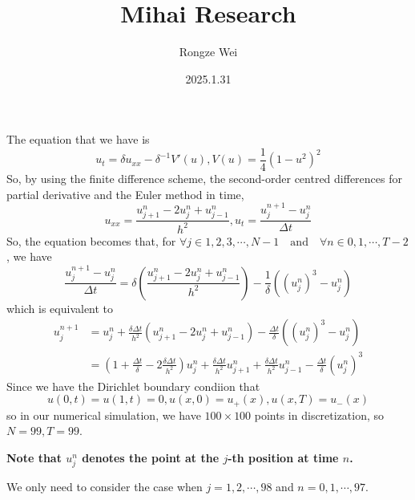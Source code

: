 \documentclass{article}
\title{Mihai Research}
\author{Rongze Wei}
\date{2025.1.31}
\begin{document}
\maketitle
\noindent
The equation that we have is $$u_t  = \delta u_{xx} - \delta^{-1}V'(u), V(u) = \frac{1}{4}(1-u^2)^2$$
So, by using the finite difference scheme, the second-order centred differences for partial derivative and the Euler method in time, $$u_{xx} = \frac{u_{j+1}^n - 2u_j^{n} + u_{j-1}^n}{h^2}, u_t = \frac{u_{j}^{n+1} - u_{j}^{n}}{\Delta t}$$
So, the equation becomes that, for $\forall j \in {1,2,3,\cdots,N-1} \quad \text{and} \quad \forall n \in {0,1,\cdots, T-2}$, we have $$\frac{u_j^{n+1} - u_j^n}{\Delta t} = \delta(\frac{u_{j+1}^n - 2u_j^n + u_{j-1}^n}{h^2}) - \frac{1}{\delta}((u_j^n)^3 - u_j^n)$$
which is equivalent to 
\begin{align*}
    u_{j}^{n+1} &= u_j^n + \frac{\delta \Delta t}{h^2}(u_{j+1}^n - 2u_j^n + u_{j-1}^n) - \frac{\Delta t}{\delta}((u_j^n)^3 - u_j^n)\\
    &= (1+ \frac{\Delta t}{\delta}-2\frac{\delta \Delta t}{h^2})u_j^n + \frac{\delta \Delta t}{h^2}u_{j+1}^{n} + \frac{\delta \Delta t}{h^2}u_{j-1}^{n} -  \frac{\Delta t}{\delta}(u_j^n)^3
\end{align*}
Since we have the Dirichlet boundary condiion that$$u(0,t) = u(1,t) = 0, u(x,0) = u_+(x), u(x,T) = u_-(x)$$
so in our numerical simulation, we have $100 \times 100$ points in discretization, so $N = 99, T = 99$. 

\vspace{1em}
\noindent
\textbf{Note that $u_j^n$ denotes the point at the $j$-th position at time $n$.}

\vspace{1em}
\noindent
We only need to consider the case when $j = {1,2,\cdots, 98}$ and $n = {0,1,\cdots, 97}$.
\end{document}
